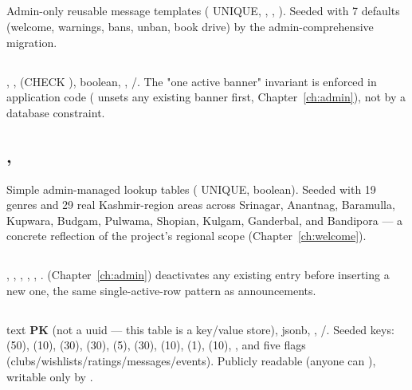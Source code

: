 \subsection*{}
Admin-only reusable message templates ( UNIQUE, , , ). Seeded with 7 defaults (welcome, warnings, bans, unban, book drive) by the admin-comprehensive migration.

\subsection*{}
, ,  (CHECK ),  boolean, , /. The "one active banner" invariant is enforced in application code ( unsets any existing banner first, Chapter~\ref{ch:admin}), not by a database constraint.

\subsection*{, }
Simple admin-managed lookup tables ( UNIQUE,  boolean). Seeded with 19 genres and 29 real Kashmir-region areas across Srinagar, Anantnag, Baramulla, Kupwara, Budgam, Pulwama, Shopian, Kulgam, Ganderbal, and Bandipora — a concrete reflection of the project's regional scope (Chapter~\ref{ch:welcome}).

\subsection*{}
, , , , , .  (Chapter~\ref{ch:admin}) deactivates any existing entry before inserting a new one, the same single-active-row pattern as announcements.

\subsection*{}
 text \textbf{PK} (not a uuid — this table is a key/value store),  jsonb, , /. Seeded keys:  (50),  (10),  (30),  (30),  (5),  (30),  (10),  (1),  (10), , and five  flags (clubs/wishlists/ratings/messages/events). Publicly readable (anyone can ), writable only by .

